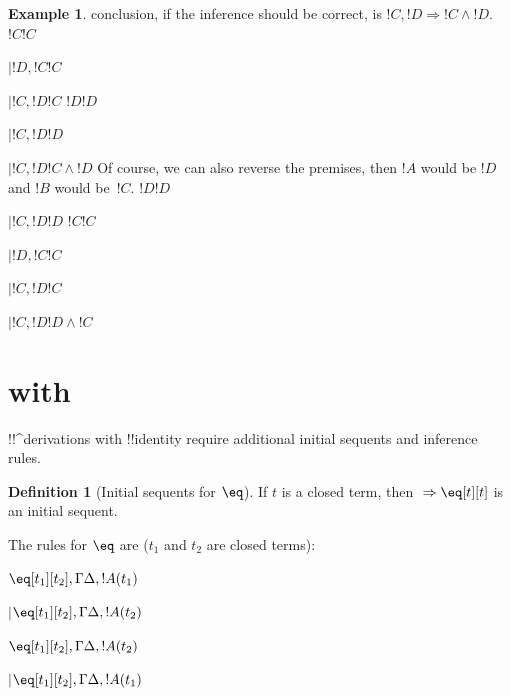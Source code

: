 \documentclass[10pt,a4paper]{article}
\theoremstyle{plain}
\theoremstyle{definition}
\newtheorem{defn}[thm]{Definition}
\newtheorem{ex}[thm]{Example}
\theoremstyle{remark}
\newcommand*{\olfileid}[3]{}
\newcommand*{\olsection}[1]{\section*{#1}}
\providecommand{\RightLabel}[1]{}
\providecommand{\DisplayProof}{}
\providecommand{\fCenter}{}
\newenvironment{prooftree}{}{}
\providecommand{\Sequent}{\mathrel{\Rightarrow}}
\providecommand{\LeftR}[1]{}
\providecommand{\RightR}[1]{}
\providecommand{\UnaryInf}{\ensuremath{\mid}}
\providecommand{\BinaryInf}{\ensuremath{\mid}}
\providecommand{\Weakening}{\mathrm{Wk}}
\providecommand{\RightR}{\mathrm{R}}
\providecommand{\LeftR}{\mathrm{L}}
\providecommand{\Axiom}{\mathrm{Ax}}
\begin{document}
\begin{ex}
conclusion, if the inference should be correct, is $!C, !D \Sequent !C
\land !D$.
\begin{prooftree}
\Axiom$ !C \fCenter !C $
\RightLabel{\LeftR{\Weakening}}
\UnaryInf$ !D, !C \fCenter !C$
\RightLabel{\LeftR{\Exchange}}
\UnaryInf$ !C, !D \fCenter !C$
\Axiom$ !D \fCenter !D $
\RightLabel{\LeftR{\Weakening}}
\UnaryInf$ !C, !D \fCenter !D$
\RightLabel{\RightR{\land}}
\BinaryInf$ !C, !D \fCenter !C \land !D $
\end{prooftree}
Of course, we can also reverse the premises, then $!A$
would be $!D$ and $!B$ would be~$!C$. 
\begin{prooftree}
\Axiom$ !D \fCenter !D $
\RightLabel{\LeftR{\Weakening}}
\UnaryInf$ !C, !D \fCenter !D$
\Axiom$ !C \fCenter !C $
\RightLabel{\LeftR{\Weakening}}
\UnaryInf$ !D, !C \fCenter !C$
\RightLabel{\LeftR{\Exchange}}
\UnaryInf$ !C, !D \fCenter !C$
\RightLabel{\RightR{\land}}
\BinaryInf$ !C, !D \fCenter !D \land !C $
\end{prooftree}
\end{ex}





\olfileid{fol}{seq}{ide}

\olsection{ with }

!!^{derivation}s with !!{identity} require additional initial sequents
and inference rules.

\begin{defn}[Initial sequents for $\eq$]
If $t$ is a closed term, then ${} \Sequent \eq[t][t]$ is an initial sequent.
\end{defn}

The rules for $\eq$ are ($t_1$ and $t_2$ are closed terms):

\begin{defish}
\Axiom$ \eq[t_1][t_2], \Gamma \fCenter \Delta, !A(t_1) $
\RightLabel{$\eq$}
\UnaryInf$\eq[t_1][t_2], \Gamma \fCenter \Delta, !A(t_2)$
\DisplayProof
\hfill
\Axiom$\eq[t_1][t_2], \Gamma \fCenter \Delta, !A(t_2) $
\RightLabel{$\eq$}
\UnaryInf$\eq[t_1][t_2], \Gamma  \fCenter \Delta, !A(t_1)$
\DisplayProof
\end{defish}
\end{document}
